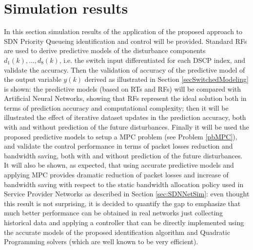 \section{Simulation results}\label{secExpRes}
In this section simulation results of the application of the proposed approach to SDN Priority Queueing identification and control will be provided. Standard RFs are used to derive predictive models of the disturbance components $d_1(k),\ldots,d_8(k)$, i.e. the switch input differentiated for each DSCP index, and validate the accuracy. Then the validation of accuracy of the predictive model of the output variable $y(k)$ derived as illustrated in Section \ref{secSwitchedModeling} is shown: the predictive models (based on RTs and RFs) will be compared with Artificial Neural Networks, showing that RFs represent the ideal solution both in terms of prediction accuracy and computational complexity; then it will be illustrated the effect of iterative dataset updates in the prediction accuracy, both with and without prediction of the future disturbances. Finally it will be used the proposed predictive models to setup a MPC problem (see Problem \ref{pbMPC}), and validate the control performance in terms of packet losses reduction and bandwidth saving, both with and without prediction of the future disturbances. It will also be shown, as expected, that using accurate predictive models and applying MPC provides dramatic reduction of packet losses and increase of bandwidth saving with respect to the static bandwidth allocation policy used in Service Provider Networks as described in Section \ref{sec:SDNNetSim}: even thought this result is not surprising, it is decided to quantify the gap to emphasize that much better performance can be obtained in real networks just collecting historical data and applying a controller that can be directly implemented using the accurate models of the proposed identification algorithm and Quadratic Programming solvers (which are well known to be very efficient).

